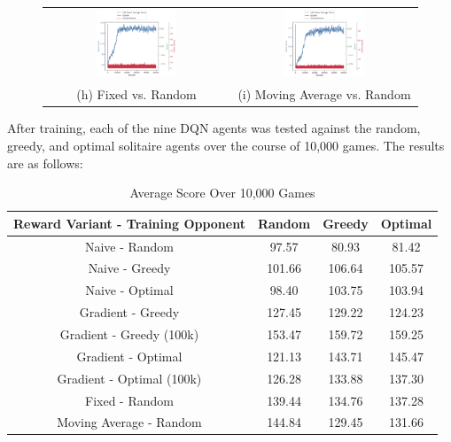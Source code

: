 \documentclass[12pt]{article}
\begin{document}
\begin{figure}[H]
    \begin{tabular}{cc}
        \includegraphics[width=0.45\textwidth]{fixed_random.png} &
        \includegraphics[width=0.45\textwidth]{flex_random.png} \\
        (h) Fixed vs. Random &
        (i) Moving Average vs. Random
    \end{tabular}
\end{figure}

\noindent
After training, each of the nine DQN agents was tested against the random, greedy, and optimal solitaire agents over the course of 10,000 games. The results are as follows:

\begin{table}[H]
    \centering
    \caption*{Average Score Over 10,000 Games}
    \begin{tabular}{ |c|c|c|c| }
        \hline
        Reward Variant - Training Opponent & Random & Greedy & Optimal \\
        \hline
        Naive - Random & 97.57 & 80.93 & 81.42 \\
        Naive - Greedy & 101.66 & 106.64 & 105.57 \\
        Naive - Optimal & 98.40 & 103.75 & 103.94 \\
        Gradient - Greedy & 127.45 & 129.22 & 124.23 \\
        Gradient - Greedy (100k) & 153.47 & 159.72 & 159.25 \\
        Gradient - Optimal & 121.13 & 143.71 & 145.47 \\
        Gradient - Optimal (100k) & 126.28 & 133.88 & 137.30 \\
        Fixed - Random & 139.44 & 134.76 & 137.28 \\
        Moving Average - Random & 144.84 & 129.45 & 131.66 \\
        \hline
    \end{tabular}
\end{table}
\end{document}
